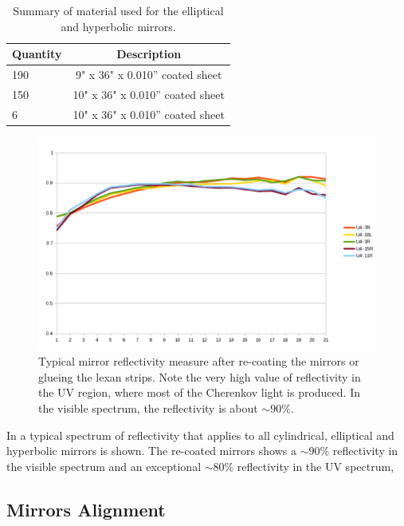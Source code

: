 \begin{table}[h]
	\begin{center}
		\begin{tabular}{| l | c |}
			\hline \hline
			Quantity  & Description \\
			\hline
			190       & 9" x 36" x 0.010” coated sheet    \\
			150       & 10" x 36" x 0.010” coated sheet   \\
			6         & 10" x 36" x 0.010” coated sheet   \\
			\hline \hline
		\end{tabular}
	\end{center}
	\caption{Summary of material used for the elliptical and hyperbolic mirrors.}\label{tab:strips}
\end{table}

\begin{figure}
\centering
\includegraphics[width=0.95\columnwidth,keepaspectratio]{img/mirrorsReflectivityAfter.png}
\caption{Typical mirror reflectivity measure after re-coating the mirrors or glueing the lexan strips. Note the very high value of reflectivity
in the UV region, where most of the Cherenkov light is produced. In the visible spectrum, the reflectivity is about $\sim 90\%$.}
\label{fig:reflectivityAfter}
\end{figure}



In  a typical spectrum of reflectivity that applies to all cylindrical, elliptical and hyperbolic mirrors is shown.
The re-coated mirrors shows a $\sim 90\%$ reflectivity in the visible spectrum and an exceptional $\sim 80\%$
reflectivity in the UV spectrum,


\subsection{Mirrors Alignment}

